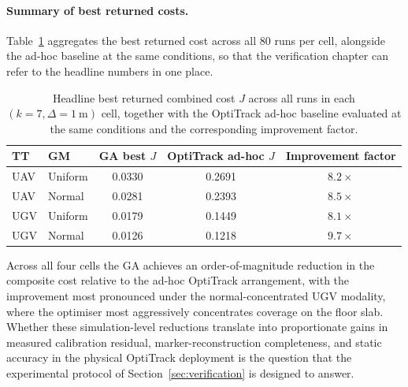 \paragraph{Summary of best returned costs.}
Table~\ref{tab:best-costs} aggregates the best returned cost across all $80$ runs per cell, alongside the ad-hoc baseline at the same conditions, so that the verification chapter can refer to the headline numbers in one place.

\begin{table}[htbp]
\centering
\caption[Headline best costs across all cells at $k=7$, $\Delta=1$~m.]{Headline best returned combined cost $J$ across all runs in each $(k=7,\Delta=1~\mathrm{m})$ cell, together with the OptiTrack ad-hoc baseline evaluated at the same conditions and the corresponding improvement factor.}
\label{tab:best-costs}
\small
\begin{tabular}{l l c c c}
\toprule
TT & GM & GA best $J$ & OptiTrack ad-hoc $J$ & Improvement factor \\
\midrule
UAV & Uniform & 0.0330 & 0.2691 & $8.2\times$ \\
UAV & Normal  & 0.0281 & 0.2393 & $8.5\times$ \\
UGV & Uniform & 0.0179 & 0.1449 & $8.1\times$ \\
UGV & Normal  & 0.0126 & 0.1218 & $9.7\times$ \\
\bottomrule
\end{tabular}
\end{table}

Across all four cells the GA achieves an order-of-magnitude reduction in the composite cost relative to the ad-hoc OptiTrack arrangement, with the improvement most pronounced under the normal-concentrated UGV modality, where the optimiser most aggressively concentrates coverage on the floor slab. Whether these simulation-level reductions translate into proportionate gains in measured calibration residual, marker-reconstruction completeness, and static accuracy in the physical OptiTrack deployment is the question that the experimental protocol of Section~\ref{sec:verification} is designed to answer.
